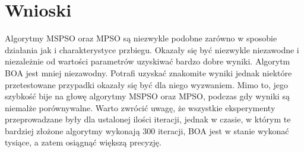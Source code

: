 \documentclass[12pt]{article}
\begin{document}
\section{Wnioski}
Algorytmy MSPSO oraz MPSO są niezwykle podobne zarówno w sposobie działania jak i charakterystyce przbiegu. Okazały się być niezwykle niezawodne i niezależnie od wartości parametrów uzyskiwać bardzo dobre wyniki. Algorytm BOA jest mniej niezawodny. Potrafi uzyskać znakomite wyniki jednak niektóre przetestowane przypadki okazały się być dla niego wyzwaniem. Mimo to, jego szybkość bije na głowę algorytmy MSPSO oraz MPSO, podczas gdy wyniki są niemalże porównywalne. Warto zwrócić uwagę, że wszystkie eksperymenty przeprowadzane były dla ustalonej ilości iteracji, jednak w czasie, w którym te bardziej złożone algorytmy wykonają 300 iteracji, BOA jest w stanie wykonać tysiące, a zatem osiągnąć większą precyzję.
\end{document}
